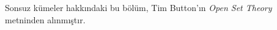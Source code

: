 


\begin{editorial}
Sonsuz kümeler hakkındaki bu bölüm, Tim Button'ın \emph{Open Set Theory}
metninden alınmıştır.
\end{editorial}


